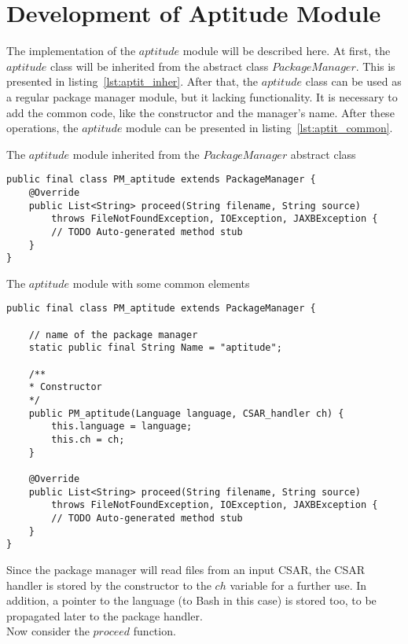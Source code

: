 \section{Development of Aptitude Module}\label{sec:aptitude_imp}
The implementation of the $aptitude$ module will be described here.
At first, the $aptitude$ class will be inherited from the abstract class $PackageManager$. 
This is presented in listing~\ref{lst:aptit_inher}. %
After that, the $aptitude$ class can be used as a regular package manager module, but it lacking functionality.
It is necessary to add the common code, like the constructor and the manager's name.
After these operations, the $aptitude$ module can be presented in listing~\ref{lst:aptit_common}. %
\begin{Listing} 
	\caption{The $aptitude$ module inherited from the $PackageManager$ abstract class}
	\label{lst:aptit_inher}
\begin{lstlisting}
public final class PM_aptitude extends PackageManager {
	@Override
	public List<String> proceed(String filename, String source)
		throws FileNotFoundException, IOException, JAXBException {
		// TODO Auto-generated method stub
	}
}
\end{lstlisting}
\end{Listing} 
\begin{Listing} 
\caption{The $aptitude$ module with some common elements}
\label{lst:aptit_common}
\begin{lstlisting}
public final class PM_aptitude extends PackageManager {

	// name of the package manager
	static public final String Name = "aptitude";
	
	/**
	* Constructor
	*/
	public PM_aptitude(Language language, CSAR_handler ch) {
		this.language = language;
		this.ch = ch;
	}
	
	@Override
	public List<String> proceed(String filename, String source)
		throws FileNotFoundException, IOException, JAXBException {
		// TODO Auto-generated method stub
	}
}
\end{lstlisting}
\end{Listing} 
Since the package manager will read files from an input CSAR, the CSAR handler is stored by the constructor to the $ch$ variable for a further use.
In addition, a pointer to the language (to Bash in this case) is stored too, to be propagated later to the package handler.\\
Now consider the $proceed$ function.
